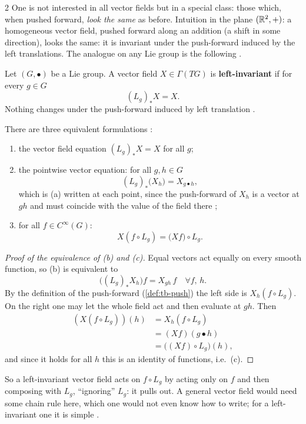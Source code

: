 \begin{paracol}{2}
One is not interested in all vector fields but in a special class: those which, when pushed forward, \emph{look the same} as before. Intuition in the plane $(\mathbb{R}^2,+)$: a homogeneous vector field, pushed forward along an addition (a shift in some direction), looks the same: it is invariant under the push-forward induced by the left translations. The analogue on any Lie group is the following   .
\begin{definition}\label{def:ll-left-inv}
Let $(G,\bullet)$ be a Lie group. A vector field $X\in\Gamma(TG)$ is \textbf{left-invariant} if for every $g\in G$
\[
  (L_g)_*X=X.
\]
Nothing changes under the push-forward induced by left translation   .
\end{definition}
There are three equivalent formulations :
\begin{enumerate}
  \item[(a)] the vector field equation $(L_g)_*X=X$ for all $g$;
  \item[(b)] the pointwise vector equation: for all $g,h\in G$
  \[
    (L_g)_*\bigl(X_h\bigr)=X_{g\bullet h},
  \]
  which is (a) written at each point, since the push-forward of $X_h$ is a vector at $gh$ and must coincide with the value of the field there   ;
  \item[(c)] for all $f\in C^\infty(G)$:
  \[
    X(f\circ L_g)=\bigl(Xf\bigr)\circ L_g.
  \]
\end{enumerate}
\begin{proof}[Proof of the equivalence of (b) and (c)]
Equal vectors act equally on every smooth function, so (b) is equivalent to
\[
  \bigl((L_g)_*X_h\bigr)f=X_{gh}\,f\quad\forall f,\,h.
\]
By the definition of the push-forward (\cref{def:tb-push}) the left side is $X_h(f\circ L_g)$. On the right one may let the whole field act and then evaluate at $gh$. Then
\[
  \begin{aligned}
  (X(f\circ L_g))(h)&=X_h(f\circ L_g)\\
  &=(Xf)(g\bullet h)\\
  &=\bigl((Xf)\circ L_g\bigr)(h),
  \end{aligned}
\]
and since it holds for all $h$ this is an identity of functions, i.e.\ (c).      
\end{proof}
So a left-invariant vector field acts on $f\circ L_g$ by acting only on $f$ and then composing with $L_g$, ``ignoring'' $L_g$: it pulls out. A general vector field would need some chain rule here, which one would not even know how to write; for a left-invariant one it is simple  .


\end{paracol}
